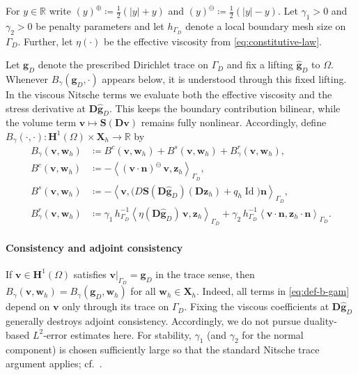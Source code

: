 \documentclass[DIV=16]{scrartcl}
\DeclareMathOperator{\Id}{Id}
\newcommand{\Ip}[2]{\left\langle #1,#2\right\rangle}
\newcommand{\abs}[1]{\left\lvert #1\right\rvert}
\newcommand{\uu}{\boldsymbol v}
\renewcommand{\vv}{\boldsymbol z}
\newcommand{\nn}{\boldsymbol n}
\newcommand{\DD}{\boldsymbol D} %
\newcommand{\Sstress}{\boldsymbol S} %
\newcommand{\GhD}{\Gamma_{D}}
\newcommand{\pos}{\oplus}
\newcommand{\negpart}{\ominus}
\newcommand{\ypos}[1]{\left(#1\right)^{\pos}}
\newcommand{\yneg}[1]{\left(#1\right)^{\negpart}}
\newcommand{\gOne}{\gamma_{1}}  %
\newcommand{\gTwo}{\gamma_{2}}  %
\newcommand{\hGD}{h_{\Gamma_D}} %
\newcommand{\etaeff}[1]{\eta \left(#1\right)}
\newcommand{\DStress}[2]{D\Sstress \left(#1\right) \left(#2\right)}
\begin{document}
For $y\in\mathbb R$ write
$\ypos{y}\coloneq \tfrac12(\abs{y}+y)$ and
$\yneg{y}\coloneq \tfrac12(\abs{y}-y)$.
Let $\gOne>0$ and $\gTwo>0$ be penalty parameters and let $\hGD$ denote a local
boundary mesh size on $\GhD$.
Further, let $\etaeff{\cdot}$ be the effective viscosity from
\eqref{eq:constitutive-law}.

Let $\boldsymbol g_D$ denote the prescribed Dirichlet trace on $\GhD$ and fix a
lifting $\hat{\boldsymbol g}_D$ to $\Omega$.
Whenever $B_\gamma(\boldsymbol g_D,\cdot)$ appears below, it is understood
through this fixed lifting.
In the viscous Nitsche terms we evaluate both the effective viscosity and the
stress derivative at $\DD\hat{\boldsymbol g}_D$.
This keeps the boundary contribution bilinear, while the volume term
$\uu\mapsto \Sstress(\DD\uu)$ remains fully nonlinear.
Accordingly, define
$B_\gamma(\cdot,\cdot):\boldsymbol H^1(\Omega)\times \boldsymbol X_h\to\mathbb R$
by
\begin{subequations}
\label{eq:def-b-gam}
\begin{alignat}{2}
\label{eq:def-b-gam-1}
B_\gamma(\uu,\boldsymbol w_h)
&\coloneq B^{c}(\uu,\boldsymbol w_h)+B^{s}(\uu,\boldsymbol w_h)+B_\gamma^{r}(\uu,\boldsymbol w_h),
\\
\label{eq:def-b-gam-2}
B^{c}(\uu,\boldsymbol w_h)
&\coloneq -\Ip{\yneg{\uu\cdot\nn}\,\uu}{\vv_h}_{\GhD},
\\
\label{eq:def-b-gam-2.5}
B^{s}(\uu,\boldsymbol w_h)
&\coloneq -\Ip{\uu}{\Big(\DStress{\DD\hat{\boldsymbol g}_D}{\DD\vv_h}+q_h\Id\Big)\nn}_{\GhD},
\\
\label{eq:def-b-gam-3}
B_\gamma^{r}(\uu,\boldsymbol w_h)
&\coloneq \gOne\,\hGD^{-1}\Ip{\etaeff{\DD\hat{\boldsymbol g}_D}\,\uu}{\vv_h}_{\GhD}
+\gTwo\,\hGD^{-1}\Ip{\uu\cdot\nn}{\vv_h\cdot\nn}_{\GhD}.
\end{alignat}
\end{subequations}

\paragraph{Consistency and adjoint consistency}
If $\uu\in\boldsymbol H^1(\Omega)$ satisfies
$\uu|_{\GhD}=\boldsymbol g_D$ in the trace sense, then
\(B_\gamma(\uu,\boldsymbol w_h)=B_\gamma(\boldsymbol g_D,\boldsymbol w_h)\) for
all $\boldsymbol w_h\in\boldsymbol X_h$.
Indeed, all terms in \eqref{eq:def-b-gam} depend on $\uu$ only through its
trace on $\GhD$.
Fixing the viscous coefficients at $\DD\hat{\boldsymbol g}_D$ generally
destroys adjoint consistency.
Accordingly, we do not pursue duality-based $L^2$-error estimates here.
For stability, $\gOne$ (and $\gTwo$ for the normal component) is chosen
sufficiently large so that the standard Nitsche trace argument applies;
cf.~\cite{JuntunenStenberg2009Nitsche}.
\end{document}
